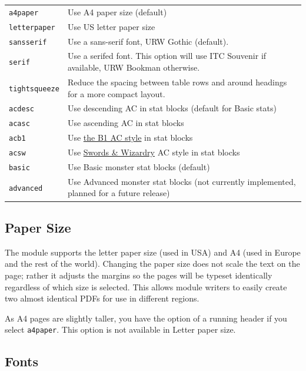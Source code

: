 \documentclass[a4paper,serif]{module}
\begin{document}
\begin{tabularx}{\linewidth}{lX}
\verb|a4paper|      & Use A4 paper size (default)\\
\verb|letterpaper|  & Use US letter paper size\\
\verb|sansserif|    & Use a sans-serif font, URW Gothic (default).\\
\verb|serif|        & Use a serifed font. This option will use ITC Souvenir if available, URW Bookman otherwise.\\
\verb|tightsqueeze| & Reduce the spacing between table rows and around headings for a more compact layout.\\
\verb|acdesc|       & Use descending AC in stat blocks (default for Basic stats)\\
\verb|acasc|        & Use ascending AC in stat blocks\\
\verb|acb1|         & Use \href{http://zenopusarchives.blogspot.com/2014/02/ascending-ac-in-holmes-basic.html}{the B1 AC style} in stat blocks\\
\verb|acsw|         & Use \href{http://www.swordsandwizardry.com/}{Swords \& Wizardry} AC style in stat blocks\\
\verb|basic|        & Use Basic monster stat blocks (default)\\
\verb|advanced|     & Use Advanced monster stat blocks (not currently implemented, planned for a future release)\\
\end{tabularx}

\subsection*{Paper Size}

The module supports the letter paper size (used in USA) and A4 (used in Europe and the rest of the world). Changing the paper size
does not scale the text on the page; rather it adjusts the margins so the pages will be typeset identically regardless
of which size is selected. This allows module writers to easily create two almost identical PDFs for use in different regions.

As A4 pages are slightly taller, you have the option of a running header if you select \verb|a4paper|. This option is not available
in Letter paper size.

\subsection*{Fonts}
\end{document}
